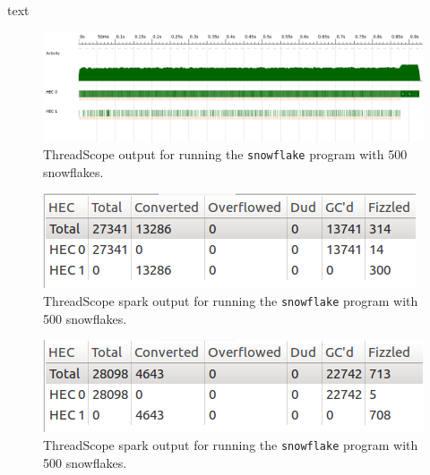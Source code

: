 \documentclass[12pt]{beamer}
\begin{document}
\begin{frame}[fragile]
  \begin{large}
    text
  \end{large}
\end{frame}

\begin{frame}
 \begin{figure}[H]
  \centering
  \includegraphics[width=\linewidth]{../threadscope/combinegrouped/bigflake}
  \caption{ThreadScope output for running the \texttt{snowflake} program with 500 snowflakes.}
  \label{fig:combinegrouped}
\end{figure}

 \begin{figure}[H]
  \centering
  \includegraphics[scale=1]{../threadscope/combinegrouped/sparks}
  \caption{ThreadScope spark output for running the \texttt{snowflake} program with 500 snowflakes.}
  \label{fig:combinegrouped-sparks}
\end{figure}
\end{frame}


\begin{frame}
 \begin{figure}[h!]
  \centering
  \includegraphics[scale=1]{../threadscope/combineindex/sparks}
  \caption{ThreadScope spark output for running the \texttt{snowflake} program with 500 snowflakes.}
  \label{fig:combineindex-sparks}
\end{figure}
\end{frame}
\end{document}
